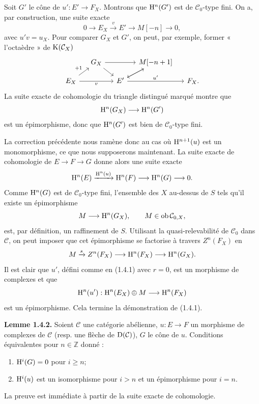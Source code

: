 \documentclass[11pt]{article}
\begin{document}
Soit \(G'\) le cône de \(u':E'\to F_X\). Montrons que \(\mathrm H^n(G')\) est de \(\mathcal C_0\)-type fini. On a, par construction, une suite exacte
\[
  0\longrightarrow E_X\xrightarrow{v}E'\longrightarrow M[-n]\longrightarrow 0,
\]
avec \(u'v=u_X\). Pour comparer \(G_X\) et \(G'\), on peut, par exemple, former « l'octaèdre » de \(\mathrm K(\mathcal C_X)\)
\[
\begin{tikzcd}[column sep=small,row sep=small]
& G_X \arrow[rr] \arrow[dr] && M[-n+1] \arrow[dl]\\
E_X \arrow[ur,"+1"] \arrow[rr,"v"'] && E' \arrow[ur] \arrow[rr,"u'"] && F_X .
\end{tikzcd}
\]
La suite exacte de cohomologie du triangle distingué marqué montre que
\[
  \mathrm H^n(G_X)\longrightarrow \mathrm H^n(G')
\]
est un épimorphisme, donc que \(\mathrm H^n(G')\) est bien de \(\mathcal C_0\)-type fini.

La correction précédente nous ramène donc au cas où \(\mathrm H^{n+1}(u)\) est un monomorphisme, ce que nous supposerons maintenant. La suite exacte de cohomologie de \(E\to F\to G\) donne alors une suite exacte
\[
  \mathrm H^n(E)\xrightarrow{\mathrm H^n(u)}
  \mathrm H^n(F)\longrightarrow \mathrm H^n(G)\longrightarrow 0.
\]
Comme \(\mathrm H^n(G)\) est de \(\mathcal C_0\)-type fini, l'ensemble des \(X\) au-dessus de \(S\) tels qu'il existe un épimorphisme
\[
  M\longrightarrow \mathrm H^n(G_X),\qquad M\in\operatorname{ob}\mathcal C_{0,X},
\]
est, par définition, un raffinement de \(S\). Utilisant la quasi-relevabilité de \(\mathcal C_0\) dans \(\mathcal C\), on peut imposer que cet épimorphisme se factorise à travers \(Z^n(F_X)\) en
\[
  M\xrightarrow{s}Z^n(F_X)\longrightarrow \mathrm H^n(F_X)\longrightarrow \mathrm H^n(G_X).
\]
Il est clair que \(u'\), défini comme en (1.4.1) avec \(r=0\), est un morphisme de complexes et que
\[
  \mathrm H^n(u'):\mathrm H^n(E_X)\oplus M\longrightarrow \mathrm H^n(F_X)
\]
est un épimorphisme. Cela termine la démonstration de (1.4.1).

\textbf{Lemme 1.4.2.} Soient \(\mathcal C\) une catégorie abélienne, \(u:E\to F\) un morphisme de complexes de \(\mathcal C\) (resp. une flèche de \(\mathrm D(\mathcal C)\)), \(G\) le cône de \(u\). Conditions équivalentes pour \(n\in\mathbb Z\) donné :
\begin{enumerate}[label=(\roman*)]
\item \(\mathrm H^i(G)=0\) pour \(i\geq n\);
\item \(\mathrm H^i(u)\) est un isomorphisme pour \(i>n\) et un épimorphisme pour \(i=n\).
\end{enumerate}
La preuve est immédiate à partir de la suite exacte de cohomologie.
\end{document}
